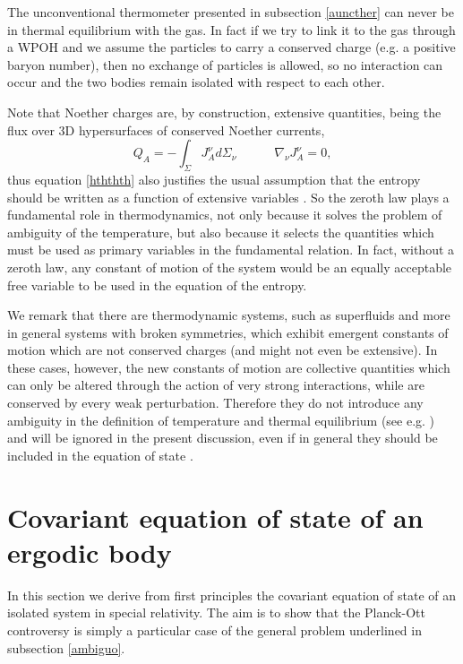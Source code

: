 \documentclass[twocolumn,usenatbib]{mnras2}
\newcommand{\spc}{\quad \quad \quad}
\begin{document}
The unconventional thermometer presented in subsection \ref{auncther} can never be in thermal equilibrium with the gas. In fact if we try to link it to the gas through a WPOH and we assume the particles to carry a conserved charge (e.g. a positive baryon number), then no exchange of particles is allowed, so no interaction can occur and the two bodies remain isolated with respect to each other. 

Note that Noether charges are, by construction, extensive quantities, being the flux over 3D hypersurfaces of conserved Noether currents,
\begin{equation}
Q_A = -\int_{\Sigma} J_A^\nu d\Sigma_\nu  \spc \nabla_\nu J_A^\nu =0,
\end{equation}
thus equation \eqref{hththth} also justifies the usual assumption that the entropy should be written as a function of extensive variables \citep{Callen_book}. So the zeroth law plays a fundamental role in thermodynamics, not only because it solves the problem of ambiguity of the temperature, but also because it selects the quantities which must be used as primary variables in the fundamental relation. In fact, without a zeroth law, any constant of motion of the system would be an equally acceptable free variable to be used in the equation of the entropy.


We remark that there are thermodynamic systems, such as superfluids and more in general systems with broken symmetries, which exhibit emergent constants of motion which are not conserved charges (and might not even be extensive). In these cases, however, the new constants of motion are collective quantities which can only be altered through the action of very strong interactions, while are conserved by every weak perturbation. Therefore they do not introduce any ambiguity in the definition of temperature and thermal equilibrium (see e.g. \citealt{Termo}) and will be ignored in the present discussion, even if in general they should be included in the equation of state \citep{Callen_book}.



\section{Covariant equation of state of an ergodic body}\label{coveos}


In this section we derive from first principles the covariant equation of state of an isolated system in special relativity. 
The aim is to show that the Planck-Ott controversy is simply a particular case of the general problem underlined in subsection \ref{ambiguo}. 
\end{document}
